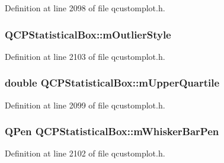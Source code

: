 Definition at line 2098 of file qcustomplot.\-h.

\hypertarget{class_q_c_p_statistical_box_ae102e4187e1e6ba1f2df0f622b5171a4}{
\subsubsection[{m\-Outlier\-Style}]{ Q\-C\-P\-Statistical\-Box\-::m\-Outlier\-Style\hspace{0.3cm}{\ttfamily [protected]}}}\label{class_q_c_p_statistical_box_ae102e4187e1e6ba1f2df0f622b5171a4}


Definition at line 2103 of file qcustomplot.\-h.

\hypertarget{class_q_c_p_statistical_box_a865afbcca332ee851aa45807381bc80e}{
\subsubsection[{m\-Upper\-Quartile}]{\setlength{\rightskip}{0pt plus 5cm}double Q\-C\-P\-Statistical\-Box\-::m\-Upper\-Quartile\hspace{0.3cm}{\ttfamily [protected]}}}\label{class_q_c_p_statistical_box_a865afbcca332ee851aa45807381bc80e}


Definition at line 2099 of file qcustomplot.\-h.

\hypertarget{class_q_c_p_statistical_box_aa719b1d722a9f82364df1497a6dc1da8}{
\subsubsection[{m\-Whisker\-Bar\-Pen}]{\setlength{\rightskip}{0pt plus 5cm}Q\-Pen Q\-C\-P\-Statistical\-Box\-::m\-Whisker\-Bar\-Pen\hspace{0.3cm}{\ttfamily [protected]}}}\label{class_q_c_p_statistical_box_aa719b1d722a9f82364df1497a6dc1da8}


Definition at line 2102 of file qcustomplot.\-h.

